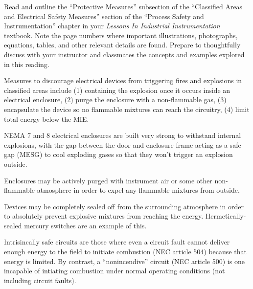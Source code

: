 

Read and outline the ``Protective Measures'' subsection of the ``Classified Areas and Electrical Safety Measures'' section of the ``Process Safety and Instrumentation'' chapter in your {\it Lessons In Industrial Instrumentation} textbook.  Note the page numbers where important illustrations, photographs, equations, tables, and other relevant details are found.  Prepare to thoughtfully discuss with your instructor and classmates the concepts and examples explored in this reading.














Measures to discourage electrical devices from triggering fires and explosions in classified areas include (1) containing the explosion once it occurs inside an electrical enclosure, (2) purge the enclosure with a non-flammable gas, (3) encapsulate the device so no flammable mixtures can reach the circuitry, (4) limit total energy below the MIE.

\vskip 10pt

NEMA 7 and 8 electrical enclosures are built very strong to withstand internal explosions, with the gap between the door and enclosure frame acting as a safe gap (MESG) to cool exploding gases so that they won't trigger an explosion outside.

\vskip 10pt

Enclosures may be actively purged with instrument air or some other non-flammable atmosphere in order to expel any flammable mixtures from outside.

\vskip 10pt

Devices may be completely sealed off from the surrounding atmosphere in order to absolutely prevent explosive mixtures from reaching the energy.  Hermetically-sealed mercury switches are an example of this.

\vskip 10pt

Intrisincally safe circuits are those where even a circuit fault cannot deliver enough energy to the field to initiate combustion (NEC article 504) because that energy is limited.  By contrast, a ``nonincendive'' circuit (NEC article 500) is one incapable of intiating combustion under normal operating conditions (not including circuit faults).

